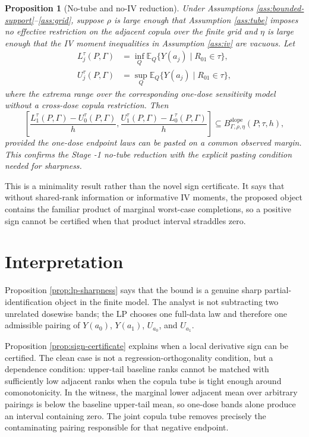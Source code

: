 \documentclass[11pt]{article}
\newcommand{\E}{\mathbb{E}}
\theoremstyle{definition}
\theoremstyle{plain}
\newtheorem{proposition}{Proposition}
\theoremstyle{remark}
\begin{document}
\begin{proposition}[No-tube and no-IV reduction]\label{prop:no-tube}
Under Assumptions \ref{ass:bounded-support}--\ref{ass:grid}, suppose \(\rho\) is large enough that Assumption \ref{ass:tube} imposes no effective restriction on the adjacent copula over the finite grid and \(\eta\) is large enough that the IV moment inequalities in Assumption \ref{ass:iv} are vacuous.  Let
\[
\begin{aligned}
L_j^\tau(P,\Gamma)
&=\inf_Q \E_Q\{Y(a_j)\mid R_{01}\in\tau\},\\
U_j^\tau(P,\Gamma)
&=\sup_Q \E_Q\{Y(a_j)\mid R_{01}\in\tau\},
\end{aligned}
\]
where the extrema range over the corresponding one-dose sensitivity model without a cross-dose copula restriction.  Then
\[
\left[
\frac{L_1^\tau(P,\Gamma)-U_0^\tau(P,\Gamma)}{h},
\frac{U_1^\tau(P,\Gamma)-L_0^\tau(P,\Gamma)}{h}
\right]
\subseteq
B_{\Gamma,\rho,\eta}^{\mathrm{slope}}(P;\tau,h),
\]
provided the one-dose endpoint laws can be pasted on a common observed margin.  This confirms the Stage -1 no-tube reduction with the explicit pasting condition needed for sharpness.
\end{proposition}

This is a minimality result rather than the novel sign certificate.  It says that without shared-rank information or informative IV moments, the proposed object contains the familiar product of marginal worst-case completions, so a positive sign cannot be certified when that product interval straddles zero.

\section{Interpretation}
Proposition \ref{prop:lp-sharpness} says that the bound is a genuine sharp partial-identification object in the finite model.  The analyst is not subtracting two unrelated dosewise bands; the LP chooses one full-data law and therefore one admissible pairing of \(Y(a_0)\), \(Y(a_1)\), \(U_{a_0}\), and \(U_{a_1}\).

Proposition \ref{prop:sign-certificate} explains when a local derivative sign can be certified.  The clean case is not a regression-orthogonality condition, but a dependence condition: upper-tail baseline ranks cannot be matched with sufficiently low adjacent ranks when the copula tube is tight enough around comonotonicity.  In the witness, the marginal lower adjacent mean over arbitrary pairings is below the baseline upper-tail mean, so one-dose bands alone produce an interval containing zero.  The joint copula tube removes precisely the contaminating pairing responsible for that negative endpoint.
\end{document}
